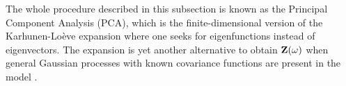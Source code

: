 The whole procedure described in this subsection is known as the Principal Component Analysis (PCA), which is the finite-dimensional version of the Karhunen-Lo\`{e}ve expansion \cite{loeve1978} where one seeks for eigenfunctions instead of eigenvectors. The expansion is yet another alternative to obtain $\mathbf{Z}(\omega)$ when general Gaussian processes with known covariance functions are present in the model \cite{maitre2010, xiu2010}.
